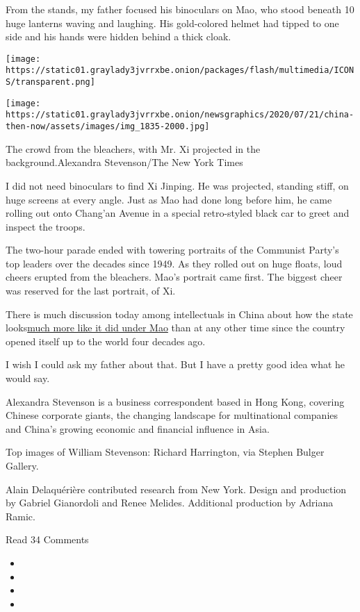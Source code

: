 From the stands, my father focused his binoculars on Mao, who stood
beneath 10 huge lanterns waving and laughing. His gold-colored helmet
had tipped to one side and his hands were hidden behind a thick cloak.

\texttt{[image: https://static01.graylady3jvrrxbe.onion/packages/flash/multimedia/ICONS/transparent.png]}

\texttt{[image: https://static01.graylady3jvrrxbe.onion/newsgraphics/2020/07/21/china-then-now/assets/images/img\_1835-2000.jpg]}

The crowd from the bleachers, with Mr. Xi projected in the
background.Alexandra Stevenson/The New York Times

I did not need binoculars to find Xi Jinping. He was projected, standing
stiff, on huge screens at every angle. Just as Mao had done long before
him, he came rolling out onto Chang'an Avenue in a special retro-styled
black car to greet and inspect the troops.

The two-hour parade ended with towering portraits of the Communist
Party's top leaders over the decades since 1949. As they rolled out on
huge floats, loud cheers erupted from the bleachers. Mao's portrait came
first. The biggest cheer was reserved for the last portrait, of Xi.

There is much discussion today among intellectuals in China about how
the state
looks\href{https://www.nytimes3xbfgragh.onion/interactive/2017/11/09/world/asia/xi-propaganda.html}{}\href{https://www.nytimes3xbfgragh.onion/interactive/2017/11/09/world/asia/xi-propaganda.html}{much
more like it did under Mao} than at any other time since the country
opened itself up to the world four decades ago.

I wish I could ask my father about that. But I have a pretty good idea
what he would say.

Alexandra Stevenson is a business correspondent based in Hong Kong,
covering Chinese corporate giants, the changing landscape for
multinational companies and China's growing economic and financial
influence in Asia.

Top images of William Stevenson: Richard Harrington, via Stephen Bulger
Gallery.

Alain Delaquérière contributed research from New York. Design and
production by Gabriel Gianordoli and Renee Melides. Additional
production by Adriana Ramic.

Read 34 Comments

\begin{itemize}
\item
\item
\item
\item
\end{itemize}

